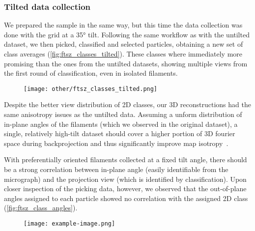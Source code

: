 \subsubsection{Tilted data collection}\label{ftsz_tilted}

We prepared the sample in the same way, but this time the data collection was done with the grid at a 35° tilt.
Following the same workflow as with the untilted dataset, we then picked, classified and selected particles, obtaining a new set of class averages (\autoref{fig:ftsz_classes_tilted}).
These classes where immediately more promising than the ones from the untilted datasets, showing multiple views from the first round of classification, even in isolated filaments. %

\begin{figure}[ht]
    \centering
    \texttt{[image: other/ftsz\_classes\_tilted.png]}
    \label{fig:ftsz_classes_tilted}
\end{figure}

Despite the better view distribution of 2D classes, our 3D reconstructions had the same anisotropy issues as the untilted data.
Assuming a unform distribution of in-plane angles of the filaments (which we observed in the original dataset), a single, relatively high-tilt dataset should cover a higher portion of 3D fourier space during backprojection and thus significantly improve map isotropy~\cite{tanAddressingPreferredSpecimen2017}.

With preferentially oriented filaments collected at a fixed tilt angle, there should be a strong correlation between in-plane angle (easily identifiable from the micrograph) and the projection view (which is identified by classification). %
Upon closer inspection of the picking data, however, we observed that the out-of-plane angles assigned to each particle showed no correlation with the assigned 2D class (\autoref{fig:ftsz_class_angles}).

\begin{figure}[ht]
    \centering
    \texttt{[image: example-image.png]}
    \label{fig:ftsz_class_angles}
\end{figure}

